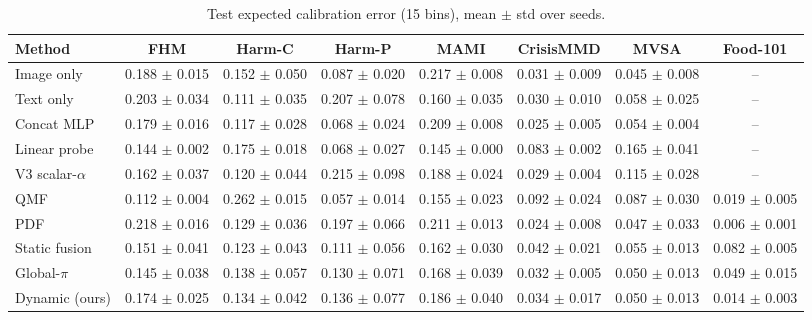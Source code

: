 \begin{table}[t]
\centering
\caption{Test expected calibration error (15 bins), mean $\pm$ std over seeds.}
\label{tab:calibration}
\begin{tabular}{lccccccc}
\toprule
Method & FHM & Harm-C & Harm-P & MAMI & CrisisMMD & MVSA & Food-101 \\
\midrule
Image only & 0.188 $\pm$ 0.015 & 0.152 $\pm$ 0.050 & 0.087 $\pm$ 0.020 & 0.217 $\pm$ 0.008 & 0.031 $\pm$ 0.009 & 0.045 $\pm$ 0.008 & – \\
Text only & 0.203 $\pm$ 0.034 & 0.111 $\pm$ 0.035 & 0.207 $\pm$ 0.078 & 0.160 $\pm$ 0.035 & 0.030 $\pm$ 0.010 & 0.058 $\pm$ 0.025 & – \\
Concat MLP & 0.179 $\pm$ 0.016 & 0.117 $\pm$ 0.028 & 0.068 $\pm$ 0.024 & 0.209 $\pm$ 0.008 & 0.025 $\pm$ 0.005 & 0.054 $\pm$ 0.004 & – \\
Linear probe & 0.144 $\pm$ 0.002 & 0.175 $\pm$ 0.018 & 0.068 $\pm$ 0.027 & 0.145 $\pm$ 0.000 & 0.083 $\pm$ 0.002 & 0.165 $\pm$ 0.041 & – \\
V3 scalar-$\alpha$ & 0.162 $\pm$ 0.037 & 0.120 $\pm$ 0.044 & 0.215 $\pm$ 0.098 & 0.188 $\pm$ 0.024 & 0.029 $\pm$ 0.004 & 0.115 $\pm$ 0.028 & – \\
QMF & 0.112 $\pm$ 0.004 & 0.262 $\pm$ 0.015 & 0.057 $\pm$ 0.014 & 0.155 $\pm$ 0.023 & 0.092 $\pm$ 0.024 & 0.087 $\pm$ 0.030 & 0.019 $\pm$ 0.005 \\
PDF & 0.218 $\pm$ 0.016 & 0.129 $\pm$ 0.036 & 0.197 $\pm$ 0.066 & 0.211 $\pm$ 0.013 & 0.024 $\pm$ 0.008 & 0.047 $\pm$ 0.033 & 0.006 $\pm$ 0.001 \\
Static fusion & 0.151 $\pm$ 0.041 & 0.123 $\pm$ 0.043 & 0.111 $\pm$ 0.056 & 0.162 $\pm$ 0.030 & 0.042 $\pm$ 0.021 & 0.055 $\pm$ 0.013 & 0.082 $\pm$ 0.005 \\
Global-$\pi$ & 0.145 $\pm$ 0.038 & 0.138 $\pm$ 0.057 & 0.130 $\pm$ 0.071 & 0.168 $\pm$ 0.039 & 0.032 $\pm$ 0.005 & 0.050 $\pm$ 0.013 & 0.049 $\pm$ 0.015 \\
Dynamic (ours) & 0.174 $\pm$ 0.025 & 0.134 $\pm$ 0.042 & 0.136 $\pm$ 0.077 & 0.186 $\pm$ 0.040 & 0.034 $\pm$ 0.017 & 0.050 $\pm$ 0.013 & 0.014 $\pm$ 0.003 \\
\bottomrule
\end{tabular}
\end{table}
